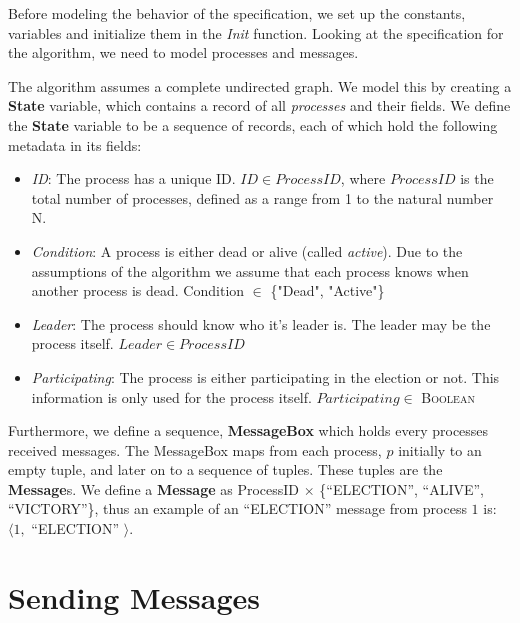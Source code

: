 \documentclass{report}
\newcommand*{\sans}{\fontfamily{lmss}\selectfont}
\begin{document}
Before modeling the behavior of the specification, we set up the constants, variables and initialize them in the \textit{Init} function. Looking at the specification for the algorithm, we need to model processes and messages.

The algorithm assumes a complete undirected graph. We model this by creating a \textbf{State} variable, which contains a record of all \textit{processes} and their fields. We define the \textbf{State} variable to be a sequence of records, each of which hold the following metadata in its fields:
\begin{itemize}
    \item \textit{ID}: The process has a unique ID. $ID \in ProcessID$, where $ProcessID$ is the total number of processes, defined as a range from 1 to the natural number N.
    \item \textit{Condition}: A process is either dead or alive (called \textit{active}). Due to the assumptions of the algorithm we assume that each process knows when another process is dead. Condition $\in$ \{{\sans"Dead", "Active"}\}
    \item \textit{Leader}: The process should know who it's leader is. The leader may be the process itself. $Leader \in ProcessID$
    \item \textit{Participating}: The process is either participating in the election or not. This information is only used for the process itself. $Participating \in$ {\small \textsc{Boolean}}
\end{itemize}
Furthermore, we define a sequence, \textbf{MessageBox} which holds every processes received messages. The MessageBox maps from each process, $p$ initially to an empty tuple, and later on to a sequence of tuples. These tuples are the \textbf{Message}s. We define a \textbf{Message} as ProcessID $\times$ \{{\sans ``ELECTION'', ``ALIVE'', ``VICTORY''}\}, thus an example of an {\sans ``ELECTION''} message from process $1$ is: $\langle1,$ {\sans ``ELECTION''} $\rangle$.

\section{Sending Messages}
\end{document}
